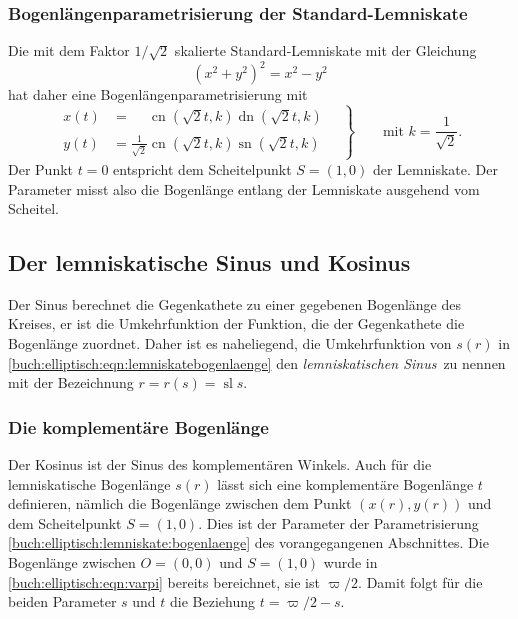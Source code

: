 \subsubsection{Bogenlängenparametrisierung der Standard-Lemniskate}
Die mit dem Faktor $1/\sqrt{2}$ skalierte Standard-Lemniskate mit der
Gleichung
\[
(x^2+y^2)^2 = x^2-y^2
\]
hat daher eine Bogenlängenparametrisierung mit
\begin{equation}
\left.
\begin{aligned}
x(t)
&=
\phantom{\frac{1}{\!\sqrt{2}}}
\operatorname{cn}(\!\sqrt{2}t,k)\operatorname{dn}(\!\sqrt{2}t,k)
\\
y(t)
&=
\frac{1}{\!\sqrt{2}}
\operatorname{cn}(\!\sqrt{2}t,k)\operatorname{sn}(\!\sqrt{2}t,k)
\end{aligned}
\quad
\right\}
\qquad
\text{mit $\displaystyle k=\frac{1}{\!\sqrt{2}}.$}
\label{buch:elliptisch:lemniskate:bogenlaenge}
\end{equation}
Der Punkt $t=0$ entspricht dem Scheitelpunkt $S=(1,0)$ der Lemniskate.
Der Parameter misst also die Bogenlänge entlang der Lemniskate ausgehend
vom Scheitel.

%
%
\subsection{Der lemniskatische Sinus und Kosinus}
Der Sinus berechnet die Gegenkathete zu einer gegebenen Bogenlänge des
Kreises, er ist die Umkehrfunktion der Funktion, die der Gegenkathete
die Bogenlänge zuordnet.
Daher ist es naheliegend, die Umkehrfunktion von $s(r)$ in 
\eqref{buch:elliptisch:eqn:lemniskatebogenlaenge}
den {\em lemniskatischen Sinus} zu nennen mit der Bezeichnung
%
%
$r=r(s)=\operatorname{sl} s$.

%
%
\subsubsection{Die komplementäre Bogenlänge}
Der Kosinus ist der Sinus des komplementären Winkels.
Auch für die lemniskatische Bogenlänge $s(r)$ lässt sich eine
komplementäre Bogenlänge $t$ definieren, nämlich die Bogenlänge
zwischen dem Punkt $(x(r), y(r))$ und dem Scheitelpunkt $S=(1,0)$.
Dies ist der Parameter der Parametrisierung
\eqref{buch:elliptisch:lemniskate:bogenlaenge}
des vorangegangenen Abschnittes.
Die Bogenlänge zwischen $O=(0,0)$ und $S=(1,0)$ wurde in
\eqref{buch:elliptisch:eqn:varpi} bereits bereichnet,
sie ist $\varpi/2$.
Damit folgt für die beiden Parameter $s$ und $t$ die Beziehung
$t = \varpi/2 - s$.

